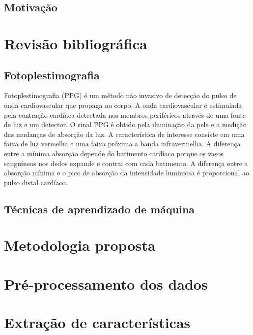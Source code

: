\documentclass[conference,compsoc]{IEEEtran}
\begin{document}
\subsection{Motiva\c{c}\~ao}

\section{Revis\~ao bibliogr\'afica}

\subsection{Fotoplestimografia}
Fotoplestimografia (PPG) \'e um m\'etodo n\~ao invasivo de detec\c{c}\~ao do pulso de onda cardiovascular que propaga no corpo. A onda cardiovascular \'e estimulada pela contra\c{c}\~ao card\'iaca detectada nos membros perif\'ericos atrav\'es de uma fonte de luz e um detector. \cite{GEUN:2008}
O sinal PPG \'e obtido pela ilumina\c{c}\~ao da pele e a medi\c{c}\~ao das mudan\c{c}as de absor\c{c}\~ao da luz. A caracter\'istica de interesse consiste em uma faixa de luz vermelha  e uma faixa pr\'oxima a banda infravermelha. A diferen\c{c}a entre a m\'inima absor\c{c}\~ao depende do batimento card\'iaco porque os vasos sangu\'ineos nos dedos expande e contrai com cada batimento. A diferen\c{c}a entre a absor\c{c}\~ao m\'inima e o pico de absor\c{c}\~ao da intensidade luminiosa \'e proporcional ao pulso distal card\'iaco.\cite{MORENO:2011}

\subsection{T\'ecnicas de aprendizado de m\'aquina}




\section{Metodologia proposta}
\section{Pr\'e-processamento dos dados}
\section{Extra\c{c}\~ao de caracter\'isticas} 
\end{document}
